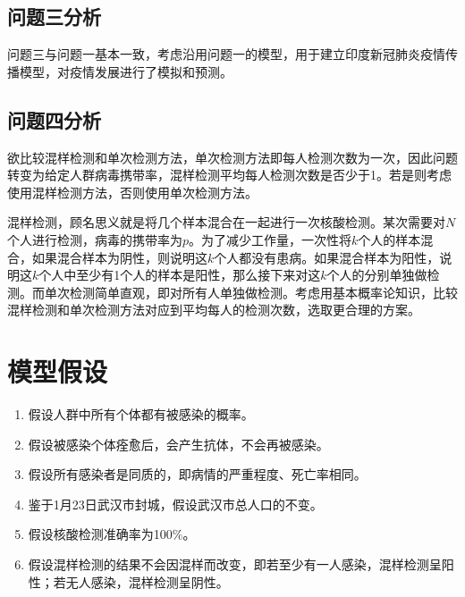 \documentclass[withoutpre]{cumcmthesis} %
\begin{document}
\subsection{问题三分析}
问题三与问题一基本一致，考虑沿用问题一的模型，用于建立印度新冠肺炎疫情传播模型，对疫情发展进行了模拟和预测。

\subsection{问题四分析}
欲比较混样检测和单次检测方法，单次检测方法即每人检测次数为一次，因此问题转变为给定人群病毒携带率，混样检测平均每人检测次数是否少于1。若是则考虑使用混样检测方法，否则使用单次检测方法。

混样检测，顾名思义就是将几个样本混合在一起进行一次核酸检测。某次需要对$N$个人进行检测，病毒的携带率为$p$。为了减少工作量，一次性将$k$个人的样本混合，如果混合样本为阴性，则说明这$k$个人都没有患病。如果混合样本为阳性，说明这$k$个人中至少有1个人的样本是阳性，那么接下来对这$k$个人的分别单独做检测。而单次检测简单直观，即对所有人单独做检测。考虑用基本概率论知识，比较混样检测和单次检测方法对应到平均每人的检测次数，选取更合理的方案。

\section{模型假设}
\begin{enumerate}
    \item 假设人群中所有个体都有被感染的概率。
    \item 假设被感染个体痊愈后，会产生抗体，不会再被感染。
    \item 假设所有感染者是同质的，即病情的严重程度、死亡率相同。
    \item 鉴于1月23日武汉市封城，假设武汉市总人口的不变。
    \item 假设核酸检测准确率为100\%。
    \item 假设混样检测的结果不会因混样而改变，即若至少有一人感染，混样检测呈阳性；若无人感染，混样检测呈阴性。
\end{enumerate}
\end{document}
